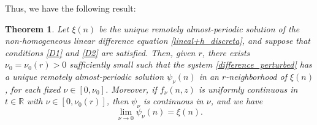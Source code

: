 \documentclass[english,,reqno]{amsart}
\numberwithin{equation}{section}
\theoremstyle{plain}
\newtheorem{thm}{Theorem}[section]
\theoremstyle{definition}
\theoremstyle{remark}
\begin{document}
Thus, we have the following result:  

\begin{thm}\label{thm_difference_perturbed}
Let $\xi(n)$ be the unique remotely almost-periodic solution of the non-homogeneous linear difference equation \eqref{lineal+h_discreta},  
and suppose that conditions \ref{D1} and \ref{D2} are satisfied.  
Then, given $r$, there exists $\nu_0 = \nu_0(r) > 0$ sufficiently small such that the system \eqref{difference_perturbed}  
has a unique remotely almost-periodic solution $\psi_\nu(n)$ in an $r$-neighborhood of $\xi(n)$, for each fixed $\nu \in [0, \nu_0]$.  
Moreover, if $f_\nu(n, z)$ is uniformly continuous in $t \in \mathbb{R}$ with $\nu \in [0, \nu_0(r)]$,  
then $\psi_\nu$ is continuous in $\nu$, and we have  
\[
\lim_{\nu \rightarrow 0} \psi_\nu(n) = \xi(n).
\]
\end{thm}
\end{document}
